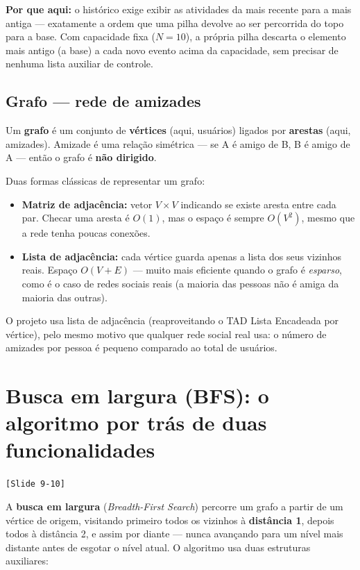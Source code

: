 \documentclass[11pt,a4paper]{article}
\newcommand{\slideref}[1]{\textcolor{accentwarm}{\texttt{[Slide #1]}}}
\begin{document}
\textbf{Por que aqui:} o histórico exige exibir as atividades da mais
recente para a mais antiga --- exatamente a ordem que uma pilha devolve ao
ser percorrida do topo para a base. Com capacidade fixa ($N=10$), a própria
pilha descarta o elemento mais antigo (a base) a cada novo evento acima da
capacidade, sem precisar de nenhuma lista auxiliar de controle.

\subsection{Grafo --- rede de amizades}

Um \textbf{grafo} é um conjunto de \textbf{vértices} (aqui, usuários) ligados
por \textbf{arestas} (aqui, amizades). Amizade é uma relação simétrica --- se
A é amigo de B, B é amigo de A --- então o grafo é \textbf{não dirigido}.

Duas formas clássicas de representar um grafo:
\begin{itemize}
  \item \textbf{Matriz de adjacência:} vetor $V \times V$ indicando se existe
    aresta entre cada par. Checar uma aresta é $O(1)$, mas o espaço é sempre
    $O(V^2)$, mesmo que a rede tenha poucas conexões.
  \item \textbf{Lista de adjacência:} cada vértice guarda apenas a lista dos
    seus vizinhos reais. Espaço $O(V+E)$ --- muito mais eficiente quando o
    grafo é \emph{esparso}, como é o caso de redes sociais reais (a maioria
    das pessoas não é amiga da maioria das outras).
\end{itemize}

O projeto usa lista de adjacência (reaproveitando o TAD Lista Encadeada por
vértice), pelo mesmo motivo que qualquer rede social real usa: o número de
amizades por pessoa é pequeno comparado ao total de usuários.

\section{Busca em largura (BFS): o algoritmo por trás de duas funcionalidades}
\label{sec:bfs}
\slideref{9-10}

A \textbf{busca em largura} (\emph{Breadth-First Search}) percorre um grafo
a partir de um vértice de origem, visitando primeiro todos os vizinhos à
\textbf{distância 1}, depois todos à distância 2, e assim por diante ---
nunca avançando para um nível mais distante antes de esgotar o nível atual.
O algoritmo usa duas estruturas auxiliares:
\end{document}
